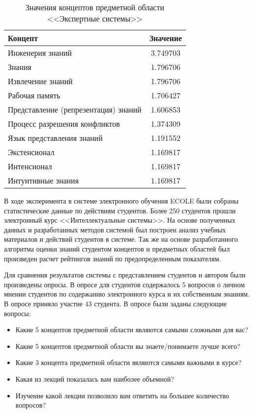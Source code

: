 \begin{table}
\centering
\caption{Значения концептов предметной области <<Экспертные системы>>}
\label{table:term_importance_result}
\begin{tabular}{|p{8cm}|c|}
\hline Концепт & Значение \\
\hline Инженерия знаний & 3.749703 \\
\hline Знания & 1.796706 \\
\hline Извлечение знаний & 1.796706 \\
\hline Рабочая память & 1.706427 \\
\hline Представление (репрезентация) знаний & 1.606853 \\
\hline Процесс разрешения конфликтов & 1.374309 \\
\hline Язык представления знаний & 1.191552 \\
\hline Экстенсионал & 1.169817 \\
\hline Интенсионал & 1.169817 \\
\hline Интуитивные знания & 1.169817 \\
\hline
\end{tabular}
\end{table}

В ходе эксперимента в системе электронного обучения ECOLE были собраны статистические данные по действиям студентов. Более 250 студентов прошли электронный курс <<Интеллектуальные системы>>. На основе полученных данных и разработанных методов системой был построен анализ учебных материалов и действий студентов в системе. Так же на основе разработанного алгоритма оценки знаний студентом концептов и предметных областей был произведен расчет рейтингов знаний по предопределенным показателям. 

Для сравнения результатов системы с представлением студентов и автором были произведены опросы. В опросе для студентов содержалось 5 вопросов о личном мнении студентов по содержанию электронного курса и их собственным знаниям. В опросе приняло участие 43 студента. В опросе были заданы следующие вопросы:

\begin{itemize}
\item Какие 5 концептов предметной области являются самыми сложными для вас?
\item Какие 5 концептов предметной области вы знаете/понимаете лучше всего?
\item Какие 3 концепта предметной области являются самыми важными в курсе?
\item Какая из лекций показалась вам наиболее объемной?
\item Изучение какой лекции позволило вам ответить на большее количество вопросов?
\end{itemize}

